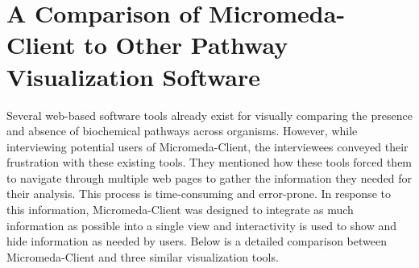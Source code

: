 \section{A Comparison of Micromeda-Client to Other Pathway Visualization Software} \label{visualization-comparison}

Several web-based software tools already exist for visually comparing the presence and absence of biochemical pathways across organisms. However, while interviewing potential users of Micromeda-Client, the interviewees conveyed their frustration with these existing tools. They mentioned how these tools forced them to navigate through multiple web pages to gather the information they needed for their analysis. This process is time-consuming and error-prone. In response to this information, Micromeda-Client was designed to integrate as much information as possible into a single view and interactivity is used to show and hide information as needed by users. Below is a detailed comparison between Micromeda-Client and three similar visualization tools.


